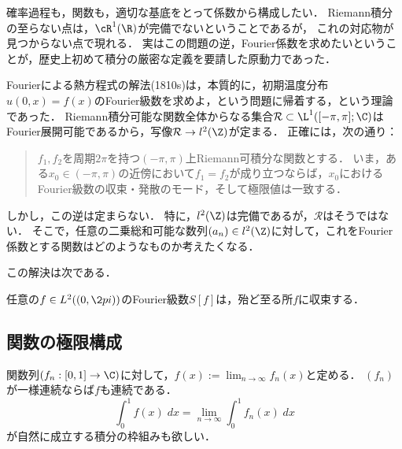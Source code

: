 \documentclass[uplatex, dvipdfmx]{jsreport}
\begin{document}
\begin{tcolorbox}[colframe=ForestGreen, colback=ForestGreen!10!white,breakable,colbacktitle=ForestGreen!40!white,coltitle=black,fonttitle=\bfseries\sffamily,
title=]
    確率過程も，関数も，適切な基底をとって係数から構成したい．
    Riemann積分の至らない点は，$\cR^1(\R)$が完備でないということであるが，
    これの対応物が見つからない点で現れる．
    実はこの問題の逆，Fourier係数を求めたいということが，歴史上初めて積分の厳密な定義を要請した原動力であった．
\end{tcolorbox}

\begin{question}[Fourier係数を指定して得る関数はどのような関数か？]
    Fourierによる熱方程式の解法(1810s)は，本質的に，初期温度分布$u(0,x)=f(x)$のFourier級数を求めよ，という問題に帰着する，という理論であった．
    Riemann積分可能な関数全体からなる集合$\mathcal{R}\subset\L^1([-\pi,\pi];\C)$はFourier展開可能であるから，写像$\mathcal{R}\to l^2(\Z)$が定まる．
    正確には，次の通り：
    \begin{quote}
        $f_1,f_2$を周期$2\pi$を持つ$(-\pi,\pi)$上Riemann可積分な関数とする．
        いま，ある$x_0\in(-\pi,\pi)$の近傍において$f_1=f_2$が成り立つならば，$x_0$におけるFourier級数の収束・発散のモード，そして極限値は一致する．\cite{藤田宏}
    \end{quote}
    しかし，この逆は定まらない．
    特に，$l^2(\Z)$は完備であるが，$\mathcal{R}$はそうではない．
    そこで，任意の二乗総和可能な数列$(a_n)\in l^2(\Z)$に対して，これをFourier係数とする関数はどのようなものか考えたくなる．
\end{question}

この解決は次である．

\begin{theorem}[Carleson, L. (1966)]
    任意の$f\in L^2((0,\2pi))$のFourier級数$S[f]$は，殆ど至る所$f$に収束する．
\end{theorem}

\subsection{関数の極限構成}

\begin{question}[連続関数の極限はどんな関数か？]
    関数列$(f_n:[0,1]\to\C)$に対して，$f(x):=\lim_{n\to\infty}f_n(x)$と定める．
    $(f_n)$が一様連続ならば$f$も連続である．
    \[\int^1_0f(x)\;dx=\lim_{n\to\infty}\int^1_0f_n(x)\;dx\]
    が自然に成立する積分の枠組みも欲しい．
\end{question}
\end{document}

